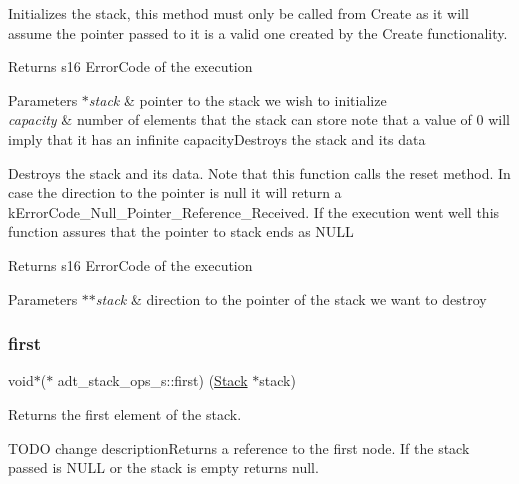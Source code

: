 Initializes the stack, this method must only be called from Create as it will assume the pointer passed to it is a valid one created by the Create functionality.

\begin{DoxyReturn}{Returns}
s16 Error\+Code of the execution 
\end{DoxyReturn}

\begin{DoxyParams}{Parameters}
{\em $\ast$stack} & pointer to the stack we wish to initialize \\
\hline
{\em capacity} & number of elements that the stack can store note that a value of 0 will imply that it has an infinite capacity\+Destroys the stack and it\textquotesingle{}s data\\
\hline
\end{DoxyParams}
Destroys the stack and its data. Note that this function calls the reset method. In case the direction to the pointer is null it will return a k\+Error\+Code\+\_\+\+Null\+\_\+\+Pointer\+\_\+\+Reference\+\_\+\+Received. If the execution went well this function assures that the pointer to stack ends as N\+U\+LL

\begin{DoxyReturn}{Returns}
s16 Error\+Code of the execution 
\end{DoxyReturn}

\begin{DoxyParams}{Parameters}
{\em $\ast$$\ast$stack} & direction to the pointer of the stack we want to destroy \\
\hline
\end{DoxyParams}
\mbox{\label{structadt__stack__ops__s_ad28b7d3b5744eb99bf08fa0b14f155b3}} 
\subsubsection{\texorpdfstring{first}{first}}
{\footnotesize\ttfamily void$\ast$($\ast$ adt\+\_\+stack\+\_\+ops\+\_\+s\+::first) (\hyperlink{structadt__stack__s}{Stack} $\ast$stack)}



Returns the first element of the stack. 

T\+O\+DO change description\+Returns a reference to the first node. If the stack passed is N\+U\+LL or the stack is empty returns null.

